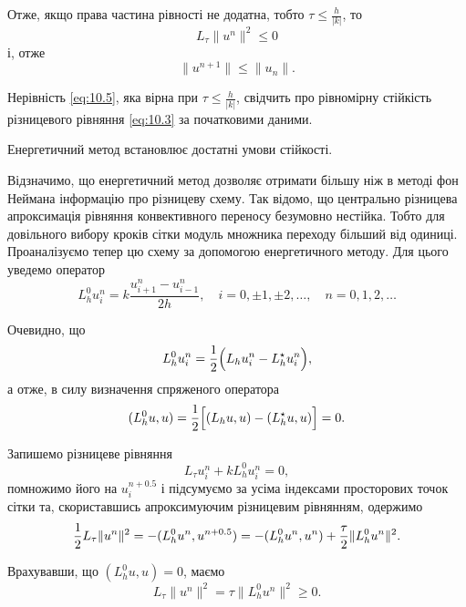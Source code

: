 Отже, якщо права частина рівності не додатна, тобто $\tau \le \frac{h}{|k|}$, то 
\begin{equation*}
    L_\tau \|u^n\|^2 \le 0
\end{equation*} 
і, отже
\begin{equation}
    \label{eq:10.5}
    \|u^{n + 1}\| \le \|u_n\|.
\end{equation}

Нерівність \eqref{eq:10.5}, яка вірна при $\tau \le \frac{h}{|k|}$, свідчить про рівномірну стійкість різницевого рівняння \eqref{eq:10.3} за початковими даними.  \medskip

Енергетичний метод встановлює достатні умови стійкості. \medskip

Відзначимо, що енергетичний метод дозволяє отримати більшу ніж в методі фон Неймана інформацію про різницеву схему. Так відомо, що центрально різницева апроксимація рівняння конвективного переносу безумовно нестійка. Тобто для довільного вибору кроків сітки модуль множника переходу більший від одиниці. Проаналізуємо тепер цю схему за допомогою енергетичного методу. Для цього уведемо оператор
\begin{equation*}
    L_h^0 u_i^n = k \frac{u_{i+1}^n - u_{i-1}^n}{2h}, \quad i = 0, \pm 1, \pm 2, \dots, \quad n = 0, 1, 2, \dots
\end{equation*}

Очевидно, що 
\begin{equation*}
    L_h^0 u_i^n = \frac{1}{2} \Big( L_h u_i^n - L_h^\star u_i^n \Big),
\end{equation*}
а отже, в силу визначення спряженого оператора
\begin{equation*}
    (L_h^0 u, u) = \frac{1}{2} \Big[ (L_h u, u) - (L_h^\star u, u) \Big] = 0.
\end{equation*}

Запишемо різницеве рівняння 
\begin{equation}
    \label{eq:10.6}
    L_\tau u_i^n + k L_h^0 u_i^n = 0,
\end{equation}
помножимо його на $u_i^{n+0.5}$ і підсумуємо за усіма індексами просторових точок сітки та, скориставшись апроксимуючим різницевим рівнянням, одержимо
\begin{equation*}
    \frac{1}{2} L_\tau \|u^n\|^2 = - (L_h^0 u^n, u^{n+0.5}) = -(L_h^0 u^n, u^n) + \frac{\tau}{2} \|L_h^0 u^n\|^2.
\end{equation*}

Врахувавши, що $(L_h^0 u, u) = 0$, маємо
\begin{equation*}
    L_\tau \|u^n\|^2 = \tau \|L_h^0 u^n\|^2 \ge 0.
\end{equation*}
 
